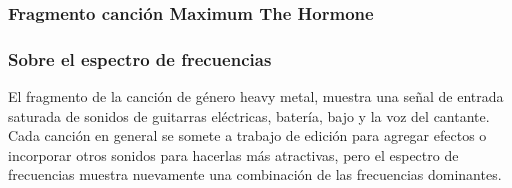 \documentclass[12pt]{beamer}
\begin{document}
\begin{frame}
\frametitle{Fragmento canción Maximum The Hormone}
\begin{figure}
    \centering
\end{figure}
\end{frame}
\begin{frame}
\frametitle{Sobre el espectro de frecuencias}
El fragmento de la canción de género heavy metal, muestra una señal de entrada saturada de sonidos de guitarras eléctricas, batería, bajo y la voz del cantante.
\\
\bigskip
\pause
Cada canción en general se somete a trabajo de edición para agregar efectos o incorporar otros sonidos para hacerlas más atractivas, pero el espectro de frecuencias muestra nuevamente una combinación de las frecuencias dominantes.
\end{frame}
\end{document}
